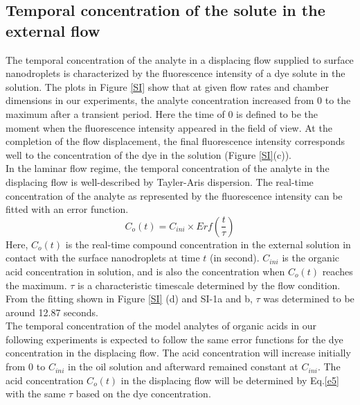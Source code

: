 \documentclass[journal=langd5,manuscript=article]{achemso}
\begin{document}
\subsection{Temporal concentration of the solute in the external flow}
The temporal concentration of the analyte in a displacing flow supplied to surface nanodroplets is characterized by the fluorescence intensity of a dye solute in the solution.  The plots in Figure \ref{SI} show that at given flow rates and chamber dimensions in our experiments, the analyte concentration increased from 0 to the maximum after a transient period. Here the time of 0 is defined to be the moment when the fluorescence intensity appeared in the field of view. At the completion of the flow displacement, the final fluorescence intensity corresponds well to the concentration of the dye in the solution (Figure \ref{SI}(c)). \\
In the laminar flow regime, the temporal concentration of the analyte in the displacing flow is well-described by Tayler-Aris dispersion.\cite{dyett2018growth} The real-time concentration of the analyte as represented by the fluorescence intensity can be fitted with an error function. 
\begin{equation}
C_o(t)=C_{ini}\times Erf(\frac{t}{\tau})
\label{e5}
\end{equation}
Here, $C_o(t)$ is the real-time compound concentration in the external solution in contact with the surface nanodroplets at time $t$ (in second). $C_{ini}$ is the organic acid concentration in solution, and is also the concentration when $C_o(t)$ reaches the maximum. $\tau$ is a characteristic timescale determined by the flow condition. From the fitting shown in Figure \ref{SI} (d) and SI-1a and b, $\tau$ was determined to be around 12.87 seconds.\\ 
The temporal concentration of the model analytes of organic acids in our following experiments is expected to follow the same error functions for the dye concentration in the displacing flow. The acid concentration will increase initially from 0 to $C_{ini}$ in the oil solution and afterward remained constant at $C_{ini}$. The acid concentration $C_o(t)$ in the displacing flow will be determined by Eq.\ref{e5} with the same $\tau$ based on the dye concentration.
\end{document}
